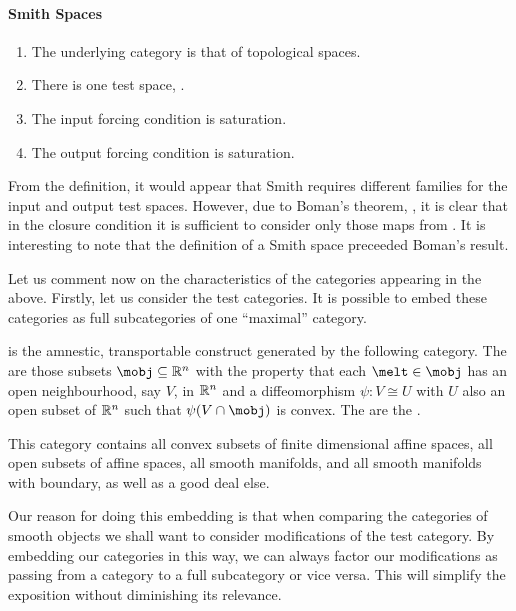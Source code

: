 \documentclass[%
a4paper,%
arxiv,%
defaults
]{myclass}
\begin{document}
\paragraph{Smith Spaces}

\begin{enumerate}
\item The underlying category is that of topological spaces.
\item There is one test space, \R.
\item The input forcing condition is saturation.
\item The output forcing condition is saturation.
\end{enumerate}

From the definition, it would appear that Smith requires different families for the input and output test spaces.
However, due to Boman's theorem, \cite{jb3}, it is clear that in the closure condition it is sufficient to consider only those maps from \R.
It is interesting to note that the definition of a Smith space preceeded Boman's result.


\medskip

Let us comment now on the characteristics of the categories appearing in the above.
Firstly, let us consider the test categories.
It is possible to embed these categories as full subcategories of one ``maximal'' category.

\begin{defn}
\emph{\mcatu{}} is the amnestic, transportable construct generated by the following category.
The \mobjs are those subsets \(\mobj \subseteq \R^n\) with the property that each \(\melt \in \mobj\) has an open neighbourhood, say \(V\), in \(\mathbb{R}^n\) and a diffeomorphism \(\psi \colon V \cong U\) with \(U\) also an open subset of \(\mathbb{R}^n\) such that \(\psi(V \cap \mobj)\) is convex.
The \mmoralts are the \cimaps.
\end{defn}

This category contains all convex subsets of finite dimensional affine spaces, all open subsets of affine spaces, all smooth manifolds, and all smooth manifolds with boundary, as well as a good deal else.

Our reason for doing this embedding is that when comparing the categories of smooth objects we shall want to consider modifications of the test category.
By embedding our categories in this way, we can always factor our modifications as passing from a category to a full subcategory or vice versa.
This will simplify the exposition without diminishing its relevance.
\end{document}
